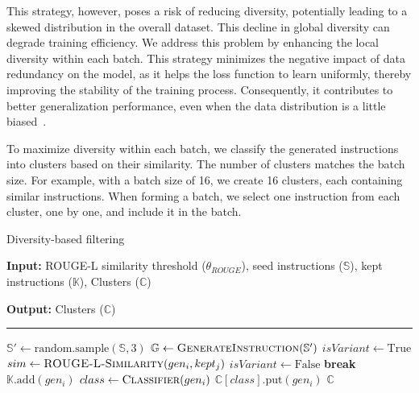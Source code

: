This strategy, however, poses a risk of reducing diversity, potentially leading
to a skewed distribution in the overall dataset. 
This decline in global diversity can degrade 
training efficiency.
We address this problem by enhancing the local diversity within
each batch.
This strategy minimizes the
negative impact of data redundancy on the model, as it helps the loss function
to learn uniformly, thereby improving the stability of the training process.
Consequently, it contributes to better generalization performance, even when
the data distribution is a little biased~\cite{batchdiversity2, batchdiversity3}.

To maximize diversity within each batch, 
we classify the generated instructions into clusters based on their similarity. 
The number of clusters matches the batch size. 
For example, with a batch size of 16, we create 16 clusters, 
each containing similar instructions. When forming a batch, we select one instruction from each cluster, one by one, and include it in the batch.


\begin{algorithm}[t]
\begin{algorithmic}[1]
\caption{Diversity-based filtering}
\label{alg:diversity-filtering}
\footnotesize
\Statex \hspace{-\algorithmicindent} \textbf{Input:} ROUGE-L similarity threshold ($\theta_{ROUGE}$), seed instructions ($\mathbb{S}$), kept instructions ($\mathbb{K}$), Clusters ($\mathbb{C}$)

\Statex \hspace{-\algorithmicindent} \textbf{Output:} Clusters ($\mathbb{C}$)
\vspace{-5pt}
\Statex \hspace{-\algorithmicindent} \rule{230pt}{.2pt}

\State $\mathbb{S}' \gets \text{random.sample}(\mathbb{S},3)$
\State $\mathbb{G} \gets \textsc{GenerateInstruction}(\mathbb{S}')$
    \State $isVariant \gets \text{True}$
        \State $sim \gets \textsc{ROUGE-L-Similarity}(gen_{i}, kept_{j})$
            \State $isVariant \gets \text{False}$
            \State \textbf{break}
        \EndIf
    \EndFor
        \State $\mathbb{K}.\text{add}(gen_{i})$
        \State $class \gets \textsc{Classifier}(gen_{i})$
        \State $\mathbb{C}[class].\text{put}(gen_{i})$
    \EndIf
\EndFor
\State \Return $\mathbb{C}$
\end{algorithmic}
\end{algorithm}

